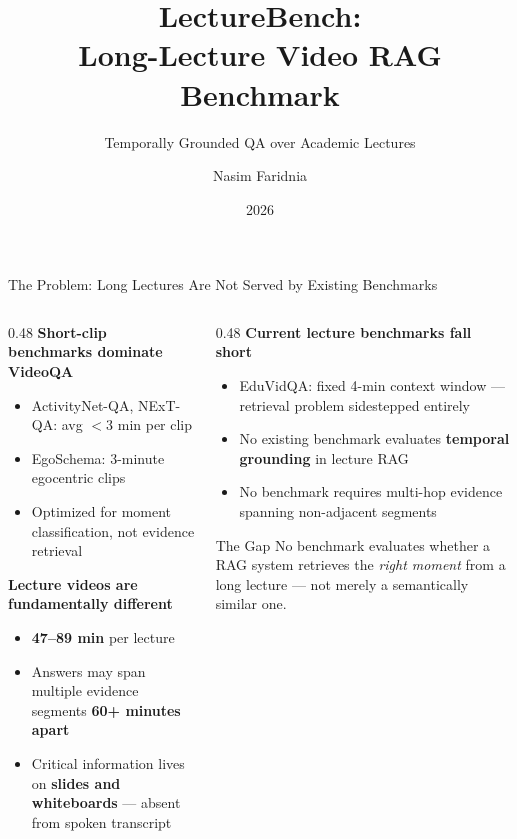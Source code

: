 \documentclass[aspectratio=169,t]{beamer}
\title[LectureBench]{LectureBench:\\Long-Lecture Video RAG Benchmark}
\subtitle{Temporally Grounded QA over Academic Lectures}
\author{Nasim Faridnia}
\institute{Department of Computer Science\\University of Texas at San Antonio}
\date{2026}
\begin{document}

\begin{frame}
\titlepage
{}
\end{frame}

\begin{frame}{The Problem: Long Lectures Are Not Served by Existing Benchmarks}

\begin{columns}[T]
\begin{column}{0.48\textwidth}
  \textbf{Short-clip benchmarks dominate VideoQA}
  \begin{itemize}
    \item ActivityNet-QA, NExT-QA: avg $<$3 min per clip
    \item EgoSchema: 3-minute egocentric clips
    \item Optimized for moment classification, not evidence retrieval
  \end{itemize}

  \medskip
  \textbf{Lecture videos are fundamentally different}
  \begin{itemize}
    \item \textbf{47--89 min} per lecture
    \item Answers may span multiple evidence segments \textbf{60+ minutes apart}
    \item Critical information lives on \textbf{slides and whiteboards} — absent from spoken transcript
  \end{itemize}
\end{column}
\begin{column}{0.48\textwidth}
  \textbf{Current lecture benchmarks fall short}
  \begin{itemize}
    \item EduVidQA: fixed 4-min context window — retrieval problem sidestepped entirely
    \item No existing benchmark evaluates \textbf{temporal grounding} in lecture RAG
    \item No benchmark requires multi-hop evidence spanning non-adjacent segments
  \end{itemize}

  \bigskip
  \begin{alertblock}{The Gap}
    No benchmark evaluates whether a RAG system retrieves the \emph{right moment}
    from a long lecture — not merely a semantically similar one.
  \end{alertblock}
\end{column}
\end{columns}

\end{frame}
\end{document}
